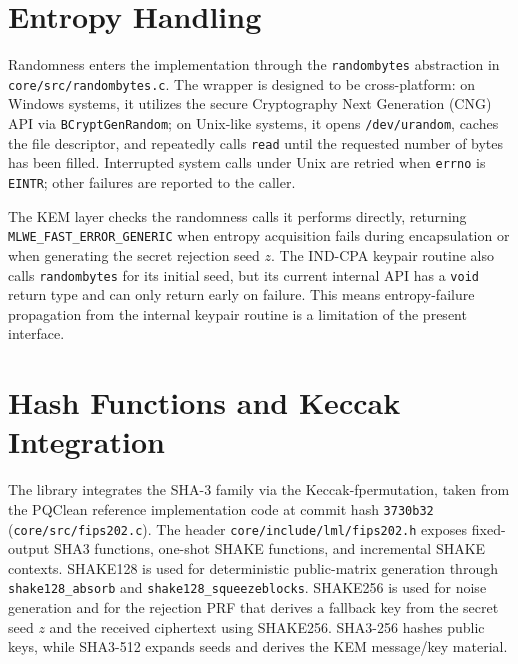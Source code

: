 \section{Entropy Handling}
\label{sec:entropy_handling}

Randomness enters the implementation through the \texttt{randombytes} abstraction in \texttt{core/\allowbreak src/\allowbreak randombytes.c}. The wrapper is designed to be cross-platform: on Windows systems, it utilizes the secure Cryptography Next Generation (CNG) API via \texttt{BCryptGenRandom}; on Unix-like systems, it opens \texttt{/dev/\allowbreak urandom}, caches the file descriptor, and repeatedly calls \texttt{read} until the requested number of bytes has been filled. Interrupted system calls under Unix are retried when \texttt{errno} is \texttt{EINTR}; other failures are reported to the caller.

The KEM layer checks the randomness calls it performs directly, returning \texttt{MLWE\_\allowbreak FAST\_\allowbreak ERROR\_\allowbreak GENERIC} when entropy acquisition fails during encapsulation or when generating the secret rejection seed $z$. The IND-CPA keypair routine also calls \texttt{randombytes} for its initial seed, but its current internal API has a \texttt{void} return type and can only return early on failure. This means entropy-failure propagation from the internal keypair routine is a limitation of the present interface.

\section{Hash Functions and Keccak Integration}
\label{sec:hash_functions}

The library integrates the SHA-3 family via the Keccak-f\allowbreak[1600] permutation, taken from the PQClean reference implementation code at commit hash \texttt{3730b32} (\texttt{core/}\allowbreak\texttt{src/}\allowbreak\texttt{fips202.c}). The header \texttt{core/}\allowbreak\texttt{include/}\allowbreak\texttt{lml/}\allowbreak\texttt{fips202.h} exposes fixed-output SHA3 functions, one-shot SHAKE functions, and incremental SHAKE contexts. SHAKE128 is used for deterministic public-matrix generation through \texttt{shake128\_\allowbreak absorb} and \texttt{shake128\_\allowbreak squeezeblocks}. SHAKE256 is used for noise generation and for the rejection PRF that derives a fallback key from the secret seed $z$ and the received ciphertext using SHAKE256. SHA3-256 hashes public keys, while SHA3-512 expands seeds and derives the KEM message/key material.

